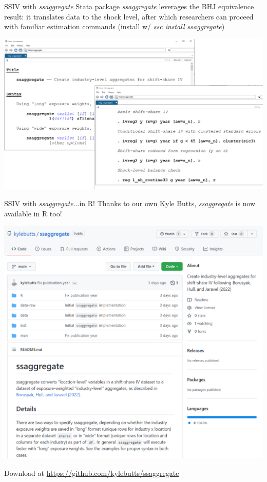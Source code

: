 \documentclass[t]{beamer}
\begin{document}
\begin{frame}{SSIV with \emph{ssaggregate}}
Stata package \emph{ssaggregate} leverages the BHJ equivalence result: it translates data to the shock level, after which researchers can proceed with familiar estimation commands (install w/ \emph{ssc install ssaggregate})

\begin{center}
\includegraphics[height=0.6\textheight]{lecture_includes/ssaggregate.png}
\end{center}

\end{frame}


\begin{frame}{SSIV with \emph{ssaggregate}...in R!}
\vspace{-0.4cm}
Thanks to our own Kyle Butts, \emph{ssaggregate} is now available in R too!

\begin{center}
\includegraphics[height=0.7\textheight]{lecture_includes/ssaggregate_R.png}
\end{center}

Download at \url{https://github.com/kylebutts/ssaggregate}

\end{frame}
\end{document}
